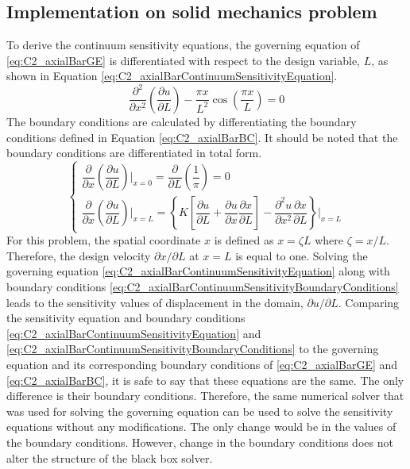 \subsection{Implementation on solid mechanics problem}
To derive the continuum sensitivity equations, the governing equation of \eqref{eq:C2_axialBarGE} is differentiated with respect to the design variable, $L$, as shown in Equation \eqref{eq:C2_axialBarContinuumSensitivityEquation}.
%
\begin{equation}\label{eq:C2_axialBarContinuumSensitivityEquation}
    \frac{\partial^2}{\partial x^2} \left( \frac{\partial u}{\partial L} \right) - 
    \frac{\pi x}{L^2} \cos \left( \frac{\pi x}{L} \right) = 0
\end{equation}
%
The boundary conditions are calculated by differentiating the boundary conditions defined in Equation \eqref{eq:C2_axialBarBC}. It should be noted that the boundary conditions are differentiated in total form.
%
\begin{equation}\label{eq:C2_axialBarContinuumSensitivityBoundaryConditions}
    \begin{cases}
    \dfrac{\partial}{\partial x} \left( \dfrac{\partial u}{\partial L} \right) \bigg|_{x = 0} = 
    \dfrac{\partial }{\partial L} \left( \dfrac{1}{\pi} \right) = 0
    \\
    \dfrac{\partial}{\partial x} \left( \dfrac{\partial u}{\partial L} \right) \bigg|_{x = L} = 
    \left\{
    K \left[ \dfrac{\partial u}{\partial L} + \dfrac{\partial u}{\partial x} \dfrac{\partial x}{\partial L} \right] - 
    \dfrac{\partial^2 u}{\partial x^2} \dfrac{\partial x}{\partial L}
    \right\} \bigg|_{x = L}
    \end{cases}
\end{equation}
%
For this problem, the spatial coordinate $x$ is defined as $x = \zeta L$ where $\zeta = x / L$. Therefore, the design velocity $\partial x/\partial L$ at $x = L$ is equal to one. Solving the governing equation \eqref{eq:C2_axialBarContinuumSensitivityEquation} along with boundary conditions \eqref{eq:C2_axialBarContinuumSensitivityBoundaryConditions} leads to the sensitivity values of displacement in the domain, $\partial u/\partial L$. Comparing the sensitivity equation and boundary conditions \eqref{eq:C2_axialBarContinuumSensitivityEquation} and \eqref{eq:C2_axialBarContinuumSensitivityBoundaryConditions} to the governing equation and its corresponding boundary conditions of \eqref{eq:C2_axialBarGE} and \eqref{eq:C2_axialBarBC}, it is safe to say that these equations are the same. The only difference is their boundary conditions. Therefore, the same numerical solver that was used for solving the governing equation can be used to solve the sensitivity equations without any modifications. The only change would be in the values of the boundary conditions. However, change in the boundary conditions does not alter the structure of the black box solver.


